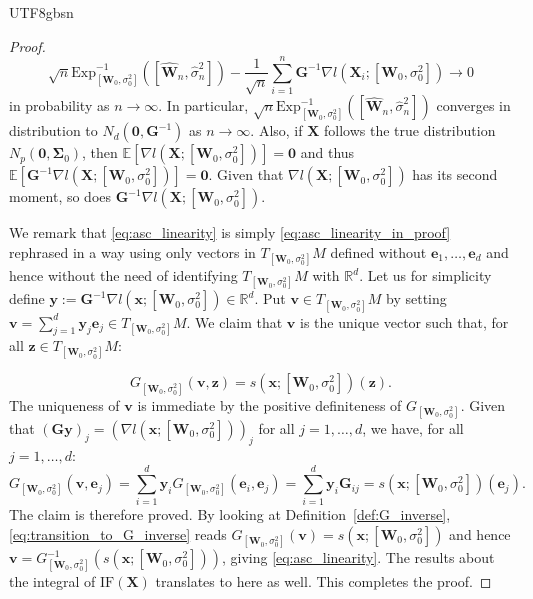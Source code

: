 \documentclass[12pt]{report}
\newcommand{\bracket}[1]{\left ( #1 \right )}
\newcommand{\squared}[1]{\left [ #1 \right ]}
\theoremstyle{plain}
\theoremstyle{definition}
\begin{document}
\begin{CJK*}{UTF8}{gbsn}
\begin{proof}
\begin{equation}\label{eq:asc_linearity_in_proof}
  \sqrt{n} \text{Exp}^{-1}_{[\bm{W}_0, \sigma_0^2]}\bracket{\squared{\hat{\bm{W}}_n,\hat{\sigma}_n^2}}
  - \frac{1}{\sqrt{n}} \sum_{i=1}^n \bm{G}^{-1} \nabla l(\bm{X}_i; [\bm{W}_0, \sigma_0^2]) \to 0
\end{equation}
in probability as $n \to \infty$.
In particular, $\sqrt{n} \text{Exp}^{-1}_{[\bm{W}_0, \sigma_0^2]}\bracket{\squared{\hat{\bm{W}}_n,\hat{\sigma}_n^2}}$
converges in distribution to $N_d(\bm{0}, \bm{G}^{-1})$ as $n \to \infty$.
Also, if $\bm{X}$ follows the true distribution $N_p(\bm{0}, \bm{\Sigma}_0)$,
then $\mathbb{E}[\nabla l(\bm{X}; [\bm{W}_0, \sigma_0^2])] = \bm{0}$
and thus $\mathbb{E}[\bm{G}^{-1}\nabla l(\bm{X}; [\bm{W}_0, \sigma_0^2])] = \bm{0}$.
Given that $\nabla l(\bm{X}; [\bm{W}_0, \sigma_0^2])$ has its second moment,
so does $\bm{G}^{-1}\nabla l(\bm{X}; [\bm{W}_0, \sigma_0^2])$.

We remark that 
\eqref{eq:asc_linearity}
is simply \eqref{eq:asc_linearity_in_proof}
rephrased in a way 
using only vectors in $T_{[\bm{W}_0, \sigma_0^2]}M$ defined without
$\bm{e}_1, \ldots, \bm{e}_d$
and hence without the need of identifying $T_{[\bm{W}_0, \sigma_0^2]}M$ with $\mathbb{R}^d$.
Let us for simplicity define $\bm{y} := \bm{G}^{-1} \nabla l(\bm{x}; [\bm{W}_0, \sigma_0^2]) \in \mathbb{R}^d$.
Put $\bm{v} \in T_{[\bm{W}_0, \sigma_0^2]}M$ by setting $\bm{v} = \sum_{j=1}^d \bm{y}_j \bm{e}_j \in T_{[\bm{W}_0, \sigma_0^2]}M$.
We claim that $\bm{v}$ is the unique vector such that, for all $\bm{z} \in T_{[\bm{W}_0, \sigma_0^2]}M$:

\begin{equation}\label{eq:transition_to_G_inverse}
  G_{[\bm{W}_0, \sigma_0^2]}(\bm{v}, \bm{z}) = s(\bm{x}; [\bm{W}_0, \sigma_0^2])(\bm{z}).
\end{equation}
The uniqueness of $\bm{v}$ is immediate by the positive definiteness of $G_{[\bm{W}_0, \sigma_0^2]}$.
Given that $(\bm{G}\bm{y})_j = (\nabla l(\bm{x}; [\bm{W}_0, \sigma_0^2]))_j$
for all $j = 1, \ldots, d$,
we have, for all $j = 1, \ldots, d$:
\begin{equation*}
  G_{[\bm{W}_0, \sigma_0^2]}(\bm{v}, \bm{e}_j) = 
  \sum_{i=1}^d \bm{y}_i G_{[\bm{W}_0, \sigma_0^2]}(\bm{e}_i, \bm{e}_j)
  = \sum_{i=1}^d \bm{y}_i \bm{G}_{ij} = s(\bm{x}; [\bm{W}_0, \sigma_0^2])(\bm{e}_j).
\end{equation*}
The claim is therefore proved.
By looking at Definition~\ref{def:G_inverse}, 
\eqref{eq:transition_to_G_inverse}
reads $G_{[\bm{W}_0, \sigma_0^2]}(\bm{v})=s(\bm{x}; [\bm{W}_0, \sigma_0^2])$
and hence $\bm{v} = G_{[\bm{W}_0, \sigma_0^2]}^{-1}(s(\bm{x}; [\bm{W}_0, \sigma_0^2]))$,
giving \eqref{eq:asc_linearity}.
The results about the integral of $\text{IF}(\bm{X})$
translates to here as well.
This completes the proof.
\end{proof}


\end{CJK*}
\end{document}
